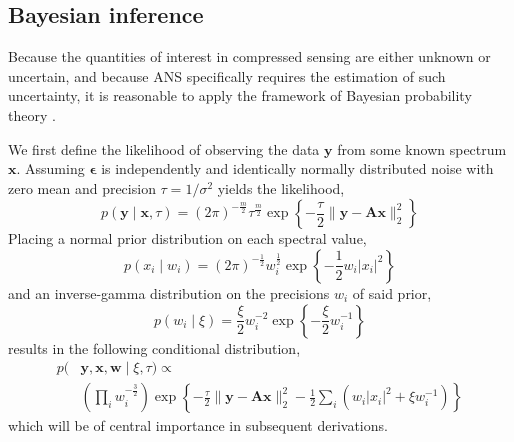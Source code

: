 \documentclass[final,5p,times,twocolumn]{elsarticle}
\newcommand{\m}[1]{\boldsymbol{#1}}
\begin{document}
\subsection{Bayesian inference}
\label{subsec:bayes}
Because the quantities of interest in compressed sensing are either unknown
or uncertain, and because ANS specifically requires the estimation of
such uncertainty, it is reasonable to apply the framework of Bayesian
probability theory \cite{ohagan2004}.

We first define the likelihood of observing the data $\m{y}$ from some
known spectrum $\m{x}$. Assuming $\m{\epsilon}$ is independently and
identically normally distributed noise with zero mean and precision
$\tau = 1/\sigma^2$ yields the likelihood,
\begin{equation}
p(\m{y} \mid \m{x}, \tau) =
 (2 \pi)^{-\frac{m}{2}} \tau^{\frac{m}{2}} \exp\left\{
  -\frac{\tau}{2} \| \m{y} - \m{A} \m{x} \|_2^2
 \right\}
\end{equation}
Placing a normal prior distribution on each spectral value,
\begin{equation}
p(x_i \mid w_i) =
 (2 \pi)^{-\frac{1}{2}} w_i^{\frac{1}{2}} \exp\left\{
  -\frac{1}{2} w_i |x_i|^2
 \right\}
\end{equation}
and an inverse-gamma distribution on the precisions $w_i$ of said prior,
\begin{equation}
p(w_i \mid \xi) =
 \frac{\xi}{2} w_i^{-2} \exp\left\{
  -\frac{\xi}{2} w_i^{-1}
 \right\}
\end{equation}
results in the following conditional distribution,
\begin{equation}
\begin{aligned}
\label{eq:joint}
p(&\m{y}, \m{x}, \m{w} \mid \xi, \tau) \propto \\
 & \left( {\textstyle\prod}_i w_i^{-\frac{3}{2}} \right)
 \exp\left\{
  -\frac{\tau}{2} \| \m{y} - \m{A} \m{x} \|_2^2
  -\frac{1}{2} {\textstyle\sum}_i \left( w_i |x_i|^2 + \xi w_i^{-1} \right)
 \right\}
\end{aligned}
\end{equation}
which will be of central importance in subsequent derivations.
\end{document}
